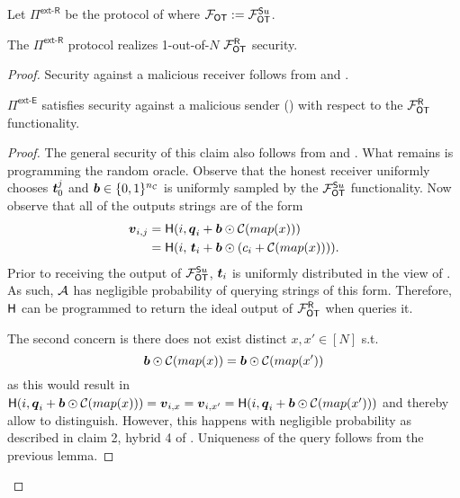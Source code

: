 \begin{definition}\label{def:ext_Su_R}
	Let $\Pi^{\textsf{ext-R}}$ be the protocol of  where $\OOT:=\OOT^{\send u}$.
\end{definition}
\begin{lemma}\label{lem:ext_Su_R}
	The $\Pi^{\textsf{ext-R}}$ protocol realizes 1-out-of-$N$ $\OOT^\rec$ security.
\end{lemma}
\begin{proof}
	Security against a malicious receiver follows from  and . 
	
	
	\begin{claim}\label{claim:ext-Su-MalSender}
		$\Pi^\textsf{ext-E}$ satisfies security against a malicious sender () with respect to the $\OOT^\rec$ functionality.
	\end{claim}
	\begin{proof}
		The general security of this claim also follows from  and . What remains is programming the random oracle. Observe that the honest receiver uniformly chooses $\tt_0^j$ and $\bb\in\{0,1\}^\nc$ is uniformly sampled by the $\OOT^{\send u}$ functionality. Now observe that all of the outputs strings are of the form
		\begin{align*}
			\vv_{i,j}&=\H(i,\qq_i + \bb \odot \mathcal{C}(map(x)))\\
					 &=\H(i,\, \tt_i + \bb \odot (c_i + \mathcal{C}(map(x)))).
		\end{align*}
		Prior to receiving the output of $\OOT^{\send u}$, $\tt_i$ is uniformly distributed in the view of \Adv. As such, $\Adv$ has negligible probability of querying strings of this form. Therefore, $\H$ can be programmed to return the ideal output of $\OOT^\rec$ when \Adv queries it.		
		\iffullversion
		
		The second concern is there does not exist distinct $x,x'\in[N]$ s.t. 
		$$
			\bb \odot \mathcal{C}(map(x)) = \bb \odot \mathcal{C}(map(x'))
		$$
		as this would result in $\H(i,\qq_i + \bb \odot \mathcal{C}(map(x)))=\vv_{i,x}=\vv_{i,x'}=\H(i,\qq_i + \bb \odot \mathcal{C}(map(x')))$ and thereby allow \Adv to distinguish. However, this happens with negligible probability as described in claim 2, hybrid 4 of .
		\else
			Uniqueness of the query follows from the previous lemma.
		\fi
		\pe
	\end{proof}
\pe
\end{proof}




